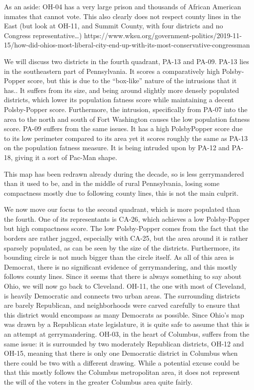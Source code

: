 \documentclass[letterpaper]{article}
\begin{document}
As an aside: OH-04 has a very large prison and thousands of African American inmates that cannot vote. This also clearly does not respect county lines in the East (but look at OH-11, and Summit County, with four districts and no Congress representative…)
https://www.wksu.org/government-politics/2019-11-15/how-did-ohios-most-liberal-city-end-up-with-its-most-conservative-congressman

We will discuss two districts in the fourth quadrant, PA-13 and PA-09. PA-13 lies in the southeastern part of Pennsylvania. It scores a comparatively high Polsby-Popper score, but this is due to the “box-like” nature of  the intrusions that it has.. It suffers from its size, and being around slightly more densely populated districts, which lower its population fatness score while maintaining a decent Polsby-Popper score. Furthermore, the intrusion, specifically from PA-07 into the area to the north and south of Fort Washington causes the low population fatness score. PA-09 suffers from the same issues. It has a high PolsbyPopper score due to its low perimeter compared to its area yet it scores roughly the same as PA-13 on the population fatness measure. It is being intruded upon by PA-12 and PA-18, giving it a sort of Pac-Man shape.

This map has been redrawn already during the decade, so is less gerrymandered than it used to be, and in the middle of rural Pennsylvania, losing some compactness mostly due to following county lines, this is not the main culprit. 

We now move our focus to the second quadrant, which is more populated than the fourth. One of its representants is CA-26, which achieves a low Polsby-Popper but high compactness score. The low Polsby-Popper comes from the fact that the borders are rather jagged, especially with CA-25, but the area around it is rather sparsely populated, as can be seen by the size of the districts. Furthermore, its bounding circle is not much bigger than the circle itself. As all of this area is Democrat, there is no significant evidence of gerrymandering, and this mostly follows county lines. Since it seems that there is always something to say about Ohio, we will now go back to Cleveland. OH-11, the one with most of Cleveland, is heavily Democratic and connects two urban areas. The surrounding districts are barely Republican, and neighborhoods were carved carefully to ensure that this district would encompass as many Democrats as possible. Since Ohio’s map was drawn by a Republican state legislature, it is quite safe to assume that this is an attempt at gerrymandering. OH-03, in the heart of Columbus, suffers from the same issue: it is surrounded by two moderately Republican districts, OH-12 and OH-15, meaning that there is only one Democratic district in Columbus when there could be two with a different drawing.  While a potential excuse could be that this mostly follows the Columbus metropolitan area, it does not represent the will of the voters in the greater Columbus area quite fairly. 
\end{document}
